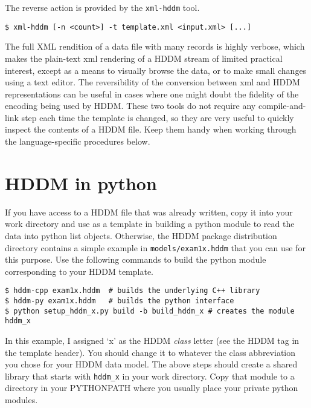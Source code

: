 \documentclass{revtex4}
\begin{document}
The reverse action is provided by the \texttt{xml-{}hddm} tool.

\vspace{0.5cm}
\begin{minipage}{12cm}
\begin{verbatim}
$ xml-hddm [-n <count>] -t template.xml <input.xml> [...]
\end{verbatim}
\end{minipage}
\vspace{0.5cm}

The full XML rendition of a data file with many records is highly verbose,
which makes the plain-text xml rendering of a HDDM stream of limited practical
interest, except as a means to visually browse the data, or to make small changes
using a text editor. The reversibility of the conversion between xml and HDDM
representations can be useful in cases where one might doubt the fidelity of the
encoding being used by HDDM. These two tools do not require any 
compile-{}and-{}link step each time the template is changed, so they are very
useful to quickly inspect the contents of a HDDM file. Keep them handy when
working through the language-{}specific procedures below.

\section{HDDM in python}

If you have access to a HDDM file that was already written, copy it into your
work directory and use as a template in building a python module to read the data
into python list objects. Otherwise, the HDDM package distribution directory contains
a simple example in \texttt{models/exam1x.hddm} that you can use for this purpose.
Use the following commands to build the python module corresponding to your HDDM
template.

\vspace{0.5cm}
\begin{minipage}{12cm}
\begin{verbatim}
$ hddm-cpp exam1x.hddm  # builds the underlying C++ library
$ hddm-py exam1x.hddm   # builds the python interface
$ python setup_hddm_x.py build -b build_hddm_x # creates the module hddm_x
\end{verbatim}
\end{minipage}
\vspace{0.5cm}

In this example, I assigned `x' as the HDDM {\em class} letter (see the HDDM tag
in the template header). You should change it to whatever the class abbreviation
you chose for your HDDM data model. The above steps should create a shared library
that starts with \texttt{hddm\_x} in your work directory. Copy that module to a
directory in your PYTHONPATH where you usually place your private python modules.
\end{document}
